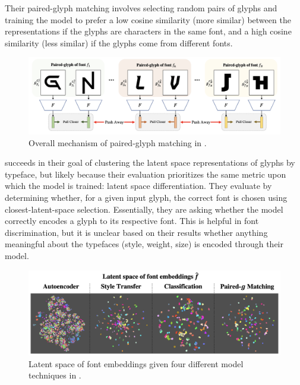 Their paired-glyph matching involves selecting random pairs of glyphs and training the model to prefer a low cosine similarity (more similar) between the representations if the glyphs are characters in the same font, and a high cosine similarity (less similar) if the glyphs come from different fonts.

\begin{figure}[htbp]
    \centering
    \includegraphics[width=1\textwidth]{images/cho-paired-glyph.png}
    \caption{Overall mechanism of paired-glyph matching in \cite{cho2022}.}
    \label{fig:cho-paired-glyph}
\end{figure}

\cite{cho2022} succeeds in their goal of clustering the latent space representations of glyphs by typeface, but likely because their evaluation prioritizes the same metric upon which the model is trained: latent space differentiation. They evaluate by determining whether, for a given input glyph, the correct font is chosen using closest-latent-space selection. Essentially, they are asking whether the model correctly encodes a glyph to its respective font. This is helpful in font discrimination, but it is unclear based on their results whether anything meaningful about the typefaces (style, weight, size) is encoded through their model.

\begin{figure}[h]
    \centering
    \includegraphics[width=1\textwidth]{images/cho-latent-space.png}
    \caption{Latent space of font embeddings given four different model techniques in \cite{cho2022}.}
    \label{fig:cho-latent-space}
\end{figure}

